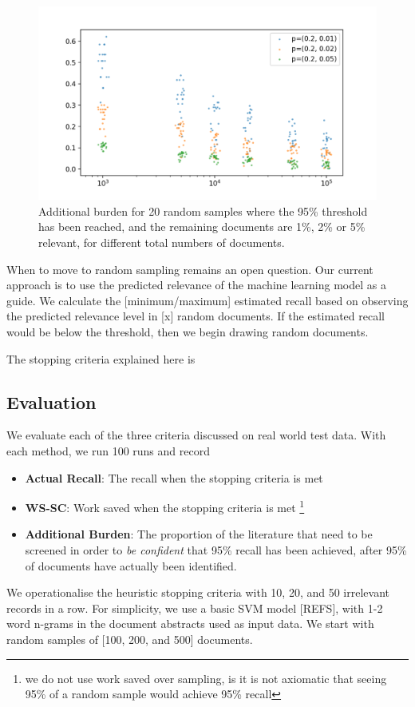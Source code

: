 \documentclass{bmcart}
\begin{document}
	\begin{figure}
		\includegraphics[width=\linewidth]{../images/additional_burden}
		\caption{Additional burden for 20 random samples where the 95\% threshold has been reached, and the remaining documents are 1\%, 2\% or 5\% relevant, for different total numbers of documents.}
		\label{additional-burden}
	\end{figure}

	When to move to random sampling remains an open question. Our current approach is to use the predicted relevance of the machine learning model as a guide. We calculate the [minimum/maximum] estimated recall based on observing the predicted relevance level in [x] random documents. If the estimated recall would be below the threshold, then we begin drawing random documents.

	The stopping criteria explained here is 
	
	\subsection*{Evaluation}
	
	We evaluate each of the three criteria discussed on real world test data. With each method, we run 100 runs and record 
	\begin{itemize}
		\item \textbf{Actual Recall}: The recall when the stopping criteria is met
		\item \textbf{WS-SC}: Work saved when the stopping criteria is met \footnote{we do not use work saved over sampling, is it is not axiomatic that seeing 95\% of a random sample would achieve 95\% recall}
		\item \textbf{Additional Burden}: The proportion of the literature that need to be screened in order to \textit{be confident} that 95\% recall has been achieved, after 95\% of documents have actually been identified.
	\end{itemize}
	We operationalise the heuristic stopping criteria with 10, 20, and 50 irrelevant records in a row. For simplicity, we use a basic SVM model [REFS], with 1-2 word n-grams in the document abstracts used as input data. We start with random samples of [100, 200, and 500] documents.
	
\end{document}
